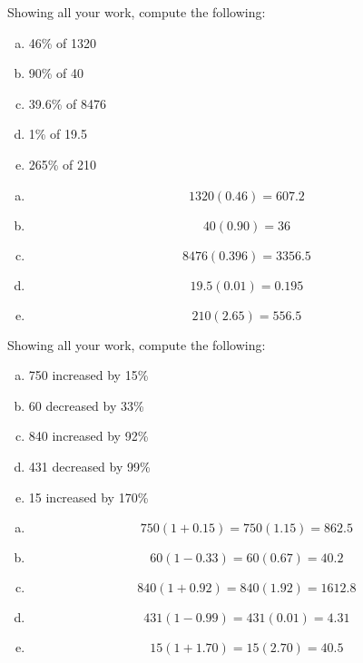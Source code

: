 \documentclass[11pt,letterpaper]{article}
\begin{document}
\newpage



 Showing all your work, compute the following:
	\begin{enumerate}[(a)]
	\item 46\% of 1320
	\item 90\% of 40
	\item 39.6\% of 8476
	\item 1\% of 19.5
	\item 265\% of 210
	\end{enumerate} \pspace

\sol
\begin{enumerate}[(a)]
\item 
	\[
	1320(0.46)= 607.2
	\] \pspace

\item
	\[
	40(0.90)= 36
	\] \pspace

\item
	\[
	8476(0.396)= 3356.5 
	\] \pspace

\item	
	\[
	19.5(0.01)= 0.195
	\] \pspace

\item
	\[
	210(2.65)= 556.5
	\]
\end{enumerate}



\newpage



 Showing all your work, compute the following:
	\begin{enumerate}[(a)]
	\item 750 increased by 15\%
	\item 60 decreased by 33\%
	\item 840 increased by 92\%
	\item 431 decreased by 99\%
	\item 15 increased by 170\%
	\end{enumerate} \pspace

\sol
\begin{enumerate}[(a)]
\item 
	\[
	750(1 + 0.15)= 750(1.15)= 862.5
	\] \pspace

\item
	\[
	60(1 - 0.33)= 60(0.67)= 40.2
	\] \pspace

\item
	\[
	840(1 + 0.92)= 840(1.92)= 1612.8
	\] \pspace

\item	
	\[
	431(1 - 0.99)= 431(0.01)= 4.31
	\] \pspace

\item
	\[
	15(1 + 1.70)= 15(2.70)= 40.5
	\]
\end{enumerate}
\end{document}
